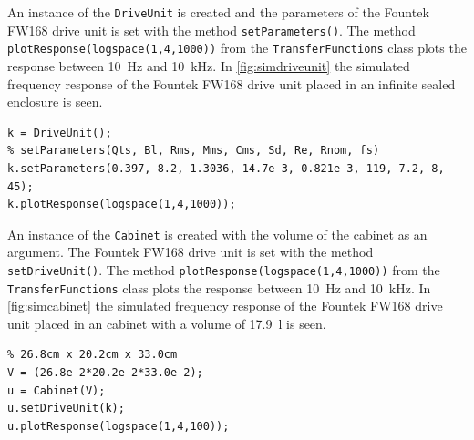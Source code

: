 An instance of the \texttt{DriveUnit} is created and the parameters of the Fountek FW168 drive unit is set with the method \texttt{setParameters()}.
The method \texttt{plotResponse(logspace(1,4,1000))} from the \texttt{TransferFunctions} class plots the response between \SI{10}{\hertz} and \SI{10}{\kilo\hertz}.
In \cref{fig:simdriveunit} the simulated frequency response of the Fountek FW168 drive unit placed in an infinite sealed enclosure is seen.
\begin{verbatim}
k = DriveUnit();
% setParameters(Qts, Bl, Rms, Mms, Cms, Sd, Re, Rnom, fs)
k.setParameters(0.397, 8.2, 1.3036, 14.7e-3, 0.821e-3, 119, 7.2, 8, 45); 
k.plotResponse(logspace(1,4,1000));
\end{verbatim}

An instance of the \texttt{Cabinet} is created with the volume of the cabinet as an argument.
The Fountek FW168 drive unit is set with the method \texttt{setDriveUnit()}.
The method \texttt{plotResponse(logspace(1,4,1000))} from the \texttt{TransferFunctions} class plots the response between \SI{10}{\hertz} and \SI{10}{\kilo\hertz}.
In \cref{fig:simcabinet} the simulated frequency response of the Fountek FW168 drive unit placed in an cabinet with a volume of \SI{17.9}{\litre} is seen. 

\begin{verbatim}
% 26.8cm x 20.2cm x 33.0cm
V = (26.8e-2*20.2e-2*33.0e-2); 
u = Cabinet(V);
u.setDriveUnit(k);
u.plotResponse(logspace(1,4,100));
\end{verbatim}


